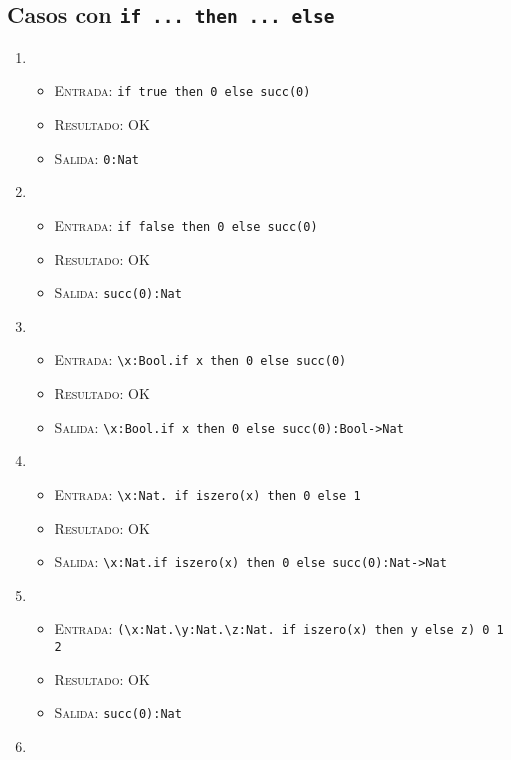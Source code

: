 \documentclass[11pt]{article}
\newcounter{savedenum}
\newcommand{\loadenum}{\setcounter{enumi}{\thesavedenum}}
\begin{document}
\subsection{Casos con \texttt{if ... then ... else}}
\begin{enumerate}
\loadenum
\item \begin{itemize}
    \item \textsc{Entrada:}   \verb|if true then 0 else succ(0)|
    \item \textsc{Resultado:} OK
    \item \textsc{Salida:}    \verb|0:Nat|
    \end{itemize}
\item \begin{itemize}
    \item \textsc{Entrada:}   \verb|if false then 0 else succ(0)|
    \item \textsc{Resultado:} OK
    \item \textsc{Salida:}    \verb|succ(0):Nat|
    \end{itemize}
\item \begin{itemize}
    \item \textsc{Entrada:}   \verb|\x:Bool.if x then 0 else succ(0)|
    \item \textsc{Resultado:} OK
    \item \textsc{Salida:}    \verb|\x:Bool.if x then 0 else succ(0):Bool->Nat|
    \end{itemize}
\item \begin{itemize}
    \item \textsc{Entrada:}   \verb|\x:Nat. if iszero(x) then 0 else 1|
    \item \textsc{Resultado:} OK
    \item \textsc{Salida:}    \verb|\x:Nat.if iszero(x) then 0 else succ(0):Nat->Nat|
    \end{itemize}
\item \begin{itemize}
    \item \textsc{Entrada:}   \verb|(\x:Nat.\y:Nat.\z:Nat. if iszero(x) then y else z) 0 1 2|
    \item \textsc{Resultado:} OK
    \item \textsc{Salida:}    \verb|succ(0):Nat|
    \end{itemize}
\item \begin{itemize}

\end{itemize}
\end{enumerate}
\end{document}
